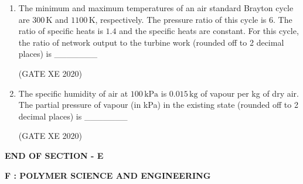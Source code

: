 \documentclass[12pt]{article}
\begin{document}
\begin{enumerate}
\item The minimum and maximum temperatures of an air standard Brayton cycle are $300 \,\text{K}$ and $1100 \,\text{K}$, respectively. 
The pressure ratio of this cycle is $6$. 
The ratio of specific heats is $1.4$ and the specific heats are constant. 
For this cycle, the ratio of network output to the turbine work (rounded off to 2 decimal places) is 
\_\_\_\_\_\_\_ 

(GATE XE 2020)

\item The specific humidity of air at $100 \,\text{kPa}$ is $0.015 \,\text{kg}$ of vapour per kg of dry air. 
The partial pressure of vapour (in kPa) in the existing state (rounded off to 2 decimal places) is 
\_\_\_\_\_\_\_ 

(GATE XE 2020)

\end{enumerate}

\begin{center}
    \textbf{END OF SECTION - E}
\end{center}

\newpage
\begin{center}
    {\Large \textbf{F : POLYMER SCIENCE AND ENGINEERING} }
\end{center}
\end{document}
